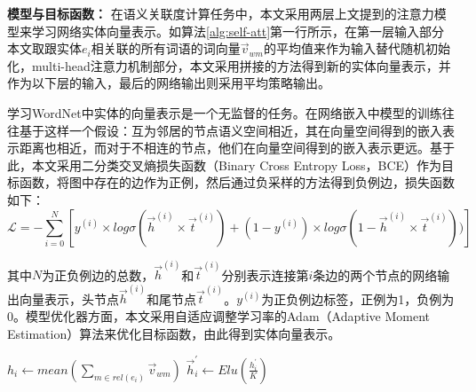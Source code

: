 \textbf{模型与目标函数：}
在语义关联度计算任务中，本文采用两层上文提到的注意力模型来学习网络实体向量表示。如算法\ref{alg:self-att}第一行所示，在第一层输入部分本文取跟实体$e_i$相关联的所有词语的词向量$\vec v_{wm}$的平均值来作为输入替代随机初始化，multi-head注意力机制部分，本文采用拼接的方法得到新的实体向量表示，并作为以下层的输入，最后的网络输出则采用平均策略输出。

学习WordNet中实体的向量表示是一个无监督的任务。在网络嵌入中模型的训练往往基于这样一个假设：互为邻居的节点语义空间相近，其在向量空间得到的嵌入表示距离也相近，而对于不相连的节点，他们在向量空间得到的嵌入表示更远。基于此，本文采用二分类交叉熵损失函数（Binary Cross Entropy Loss，BCE）作为目标函数，将图中存在的边作为正例，然后通过负采样的方法得到负例边，损失函数如下：
\begin{equation}
    \mathcal{L} = -\sum_{i = 0}^{N} [y^{(i)} \times log\sigma(\vec h^{(i)} \times \vec t^{(i)})+(1 - y_{}^{(i)})\times log\sigma⁡(1 - \vec h^{(i)} \times \vec t^{(i)}))]
    \label{wordnet_loss}
\end{equation}

\noindent 其中$N$为正负例边的总数，$\vec h^{(i)}$和$\vec t^{(i)}$分别表示连接第$i$条边的两个节点的网络输出向量表示，头节点$\vec h^{(i)}$和尾节点$\vec t^{(i)}$。$y^{(i)}$为正负例边标签，正例为1，负例为0。模型优化器方面，本文采用自适应调整学习率的Adam（Adaptive Moment Estimation）算法来优化目标函数，由此得到实体向量表示。

\begin{algorithm}
    \label{alg:self-att}
    $h_i \leftarrow mean(\sum_{m \in rel(e_i)} \vec v_{wm})$ \;
    $\vec h_i^{'} \leftarrow Elu(\frac{h_i^{'}}{K})$
\end{algorithm}

